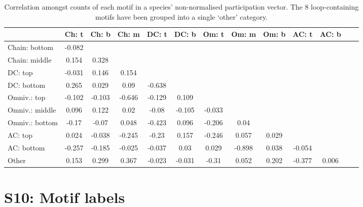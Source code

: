 \documentclass[12pt]{article}
\begin{document}
		\begin{table}[hb!]
    		\caption{Correlation amongst counts of each motif in a species' non-normalised participation vector. The 8 loop-containing motifs have been grouped into a single `other' category.}
    		\label{tab:position_Z_correlations}
    		\footnotesize
    		\begin{tabular}{l | c c c c c c c c c c c c}    
        		&	Ch: t	&	Ch: b	&	Ch: m	&	DC: t	&	DC: b	&	Om: t	&	Om: m	&	Om: b	&	AC: t	& AC: b\\
        		\hline
                Chain: bottom	&	-0.082	&		&		&		&		&		&		&		&		&		\\
                Chain: middle	&	0.154	&	0.328	&		&		&		&		&		&		&		&		\\
                DC: top	&	-0.031	&	0.146	&	0.154	&		&		&		&		&		&		&		\\
                DC: bottom	&	0.265	&	0.029	&	0.09	&	-0.638	&		&		&		&		&		&		\\
                Omniv.: top	&	-0.102	&	-0.103	&	-0.646	&	-0.129	&	0.109	&		&		&		&		&		\\
                Omniv.: middle	&	0.096	&	0.122	&	0.02	&	-0.08	&	-0.105	&	-0.033	&		&		&		&		\\
                Omniv.: bottom	&	-0.17	&	-0.07	&	0.048	&	-0.423	&	0.096	&	-0.206	&	0.04	&		&		&		\\
                AC: top	&	0.024	&	-0.038	&	-0.245	&	-0.23	&	0.157	&	-0.246	&	0.057	&	0.029	&		&		\\
                AC: bottom	&	-0.257	&	-0.185	&	-0.025	&	-0.037	&	0.03	&	0.029	&	-0.898	&	0.038	&	-0.054	&		\\
                Other	&	0.153	&	0.299	&	0.367	&	-0.023	&	-0.031	&	-0.31	&	0.052	&	0.202	&	-0.377	&	0.006	\\
            \hline
            \end{tabular}
            \end{table}


\clearpage

\section*{S10: Motif labels}
\end{document}
